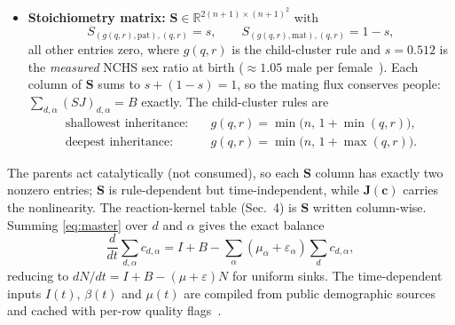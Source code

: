\documentclass[11pt,a4paper]{article}
\begin{document}
\begin{itemize}
\begin{equation}
    \end{equation}
    where the mating weights are
    \[
      m_q^{\mathrm{pat}}(\mathbf{c})
      =\frac{\beta_q^{\mathrm{pat}}c_{q,\mathrm{pat}}}
             {\sum_p\beta_p^{\mathrm{pat}}c_{p,\mathrm{pat}}},
      \qquad
      m_r^{\mathrm{mat}}(\mathbf{c})
      =\frac{\beta_r^{\mathrm{mat}}c_{r,\mathrm{mat}}}
             {\sum_p\beta_p^{\mathrm{mat}}c_{p,\mathrm{mat}}},
    \]
    (a zero denominator returns zero weights) and the total births are
    marriage-function style,
    \[
      B(\mathbf{c})=\min\!\Bigl(
      \sum_p\beta_p^{\mathrm{pat}}c_{p,\mathrm{pat}},\,
      \sum_p\beta_p^{\mathrm{mat}}c_{p,\mathrm{mat}}\Bigr),
    \]
    With probability $\alpha$ the father's cluster equals the mother's
    (assortativity); otherwise the parents are drawn independently.
  \item \textbf{Stoichiometry matrix:}
    $\mathbf{S}\in\mathbb{R}^{2(n+1)\times(n+1)^2}$ with
    \begin{equation}
      S_{(g(q,r),\mathrm{pat}),(q,r)} = s,\qquad
      S_{(g(q,r),\mathrm{mat}),(q,r)} = 1-s,
    \end{equation}
    all other entries zero, where $g(q,r)$ is the child-cluster rule and
    $s=0.512$ is the \emph{measured} NCHS sex ratio at birth
    ($\approx 1.05$ male per female~\cite{nchs-natality}).  Each column of
    $\mathbf{S}$ sums to $s+(1-s)=1$, so the mating flux conserves people:
    $\sum_{d,\alpha}(SJ)_{d,\alpha}=B$ exactly.
    The child-cluster rules are
    \begin{align}
      \text{shallowest inheritance:}&\quad
        g(q,r)=\min\!\bigl(n,\,1+\min(q,r)\bigr),\\
      \text{deepest inheritance:}&\quad
        g(q,r)=\min\!\bigl(n,\,1+\max(q,r)\bigr).
    \end{align}
\end{itemize}
The parents act catalytically (not consumed), so each $\mathbf{S}$ column
has exactly two nonzero entries; $\mathbf{S}$ is rule-dependent but
time-independent, while $\mathbf{J}(\mathbf{c})$ carries the nonlinearity.
The reaction-kernel table (Sec.~4) is $\mathbf{S}$ written column-wise.
Summing \eqref{eq:master} over $d$ and $\alpha$ gives the exact balance
\[
  \frac{d}{dt}\sum_{d,\alpha}c_{d,\alpha}
  = I + B - \sum_\alpha(\mu_\alpha+\varepsilon_\alpha)
            \sum_d c_{d,\alpha},
\]
reducing to $dN/dt = I + B - (\mu+\varepsilon)N$ for uniform sinks.
The time-dependent inputs $I(t)$, $\beta(t)$ and $\mu(t)$ are compiled from
public demographic sources and cached with per-row quality
flags~\cite{dhs-yearbook,dhs-unauth,wdi,haines,census-hsus,inputs-csv}.
\end{document}
